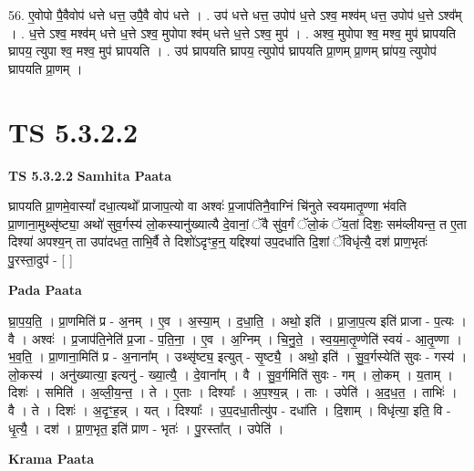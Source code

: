 \documentclass[17pt]{extarticle}
\begin{document}
56. ए॒वोपो पै॒वैवोप॑ धत्ते धत्त॒ उपै॒वै वोप॑ धत्ते । . उप॑ धत्ते धत्त॒ उपोप॑ ध॒त्ते ऽश्व॒ मश्व॑म् धत्त॒ उपोप॑ ध॒त्ते ऽश्व᳚म् । . ध॒त्ते ऽश्व॒ मश्व॑म् धत्ते ध॒त्ते ऽश्व॒ मुपोपा श्व॑म् धत्ते ध॒त्ते ऽश्व॒ मुप॑ । . अश्व॒ मुपोपा श्व॒ मश्व॒ मुप॑ घ्रापयति घ्रापय॒ त्युपा श्व॒ मश्व॒ मुप॑ घ्रापयति । . उप॑ घ्रापयति घ्रापय॒ त्युपोप॑ घ्रापयति प्रा॒णम् प्रा॒णम् घ्रा॑पय॒ त्युपोप॑ घ्रापयति प्रा॒णम् । \newline
\pagebreak
{}

\section{ TS 5.3.2.2 }

\textbf{TS 5.3.2.2 } \newline
\textbf{Samhita Paata} \newline

घ्रापयति प्रा॒णमे॒वास्यां᳚ दधा॒त्यथो᳚ प्राजाप॒त्यो वा अश्वः॑ प्र॒जाप॑तिनै॒वाग्निं चि॑नुते स्वयमातृ॒ण्णा भ॑वति प्रा॒णाना॒मुथ्सृ॑ष्ट्या॒ अथो॑ सुव॒र्गस्य॑ लो॒कस्यानु॑ख्यात्यै दे॒वानां॒ ॅवै सु॑व॒र्गं ॅलो॒कं ॅय॒तां दिशः॒ सम॑व्लीयन्त॒ त ए॒ता दिश्या॑ अपश्य॒न् ता उपा॑दधत॒ ताभि॒र्वै ते दिशो॑ऽदृꣳह॒न्॒ यद्दिश्या॑ उप॒दधा॑ति दि॒शां ॅविधृ॑त्यै॒ दश॑ प्राण॒भृतः॑ पु॒रस्ता॒दुप॑ - [  ] \newline

\textbf{Pada Paata} \newline

घ्रा॒प॒य॒ति॒ । प्रा॒णमिति॑ प्र - अ॒नम् । ए॒व । अ॒स्या॒म् । द॒धा॒ति॒ । अथो॒ इति॑ । प्रा॒जा॒प॒त्य इति॑ प्राजा - प॒त्यः । वै । अश्वः॑ । प्र॒जाप॑ति॒नेति॑ प्र॒जा - प॒ति॒ना॒ । ए॒व । अ॒ग्निम् । चि॒नु॒ते॒ । स्व॒य॒मा॒तृ॒ण्णेति॑ स्वयं - आ॒तृ॒ण्णा । भ॒व॒ति॒ । प्रा॒णाना॒मिति॑ प्र - अ॒नाना᳚म् । उथ्सृ॑ष्ट्य॒ इत्युत् - सृ॒ष्ट्यै॒ । अथो॒ इति॑ । सु॒व॒र्गस्येति॑ सुवः - गस्य॑ । लो॒कस्य॑ । अनु॑ख्यात्या॒ इत्यनु॑ - ख्या॒त्यै॒ । दे॒वाना᳚म् । वै । सु॒व॒र्गमिति॑ सुवः - गम् । लो॒कम् । य॒ताम् । दिशः॑ । समिति॑ । अ॒व्ली॒य॒न्त॒ । ते । ए॒ताः । दिश्याः᳚ । अ॒प॒श्य॒न्न् । ताः । उपेति॑ । अ॒द॒ध॒त॒ । ताभिः॑ । वै । ते । दिशः॑ । अ॒दृꣳ॒॒ह॒न्न् । यत् । दिश्याः᳚ । उ॒प॒दधा॒तीत्यु॑प - दधा॑ति । दि॒शाम् । विधृ॑त्या॒ इति॒ वि - धृ॒त्यै॒ । दश॑ । प्रा॒ण॒भृत॒ इति॑ प्राण - भृतः॑ । पु॒रस्ता᳚त् । उपेति॑ ।  \newline


\textbf{Krama Paata} \newline
\end{document}
